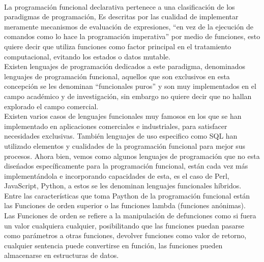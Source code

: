 \begin{multicols}{2}



 \\ %
La programación funcional declarativa pertenece a una clasificación de los paradigmas de programación, 
Es descritas por las cualidad de implementar  meramente mecanismos de evaluación de expresiones,  
``en vez de la ejecución de comandos como lo hace la programación imperativa'' por medio de funciones, 
esto quiere decir que utiliza funciones como factor principal en el tratamiento  computacional, evitando 
los estados o datos mutable.\\
Existen lenguajes de programación dedicados  a este paradigma, denominados lenguajes de programación funcional, 
aquellos que son exclusivos en esta concepción  se les denominan ``funcionales puros'' y son muy implementados en el 
campo académico y de investigación, sin embargo no quiere decir que no hallan explorado el campo comercial.\\
Existen varios casos de lenguajes funcionales muy famosos en los que se han implementado en aplicaciones comerciales e industriales, 
para satisfacer necesidades exclusivas. También lenguajes de uso especifico como SQL han utilizado  elementos y cualidades 
de la programación funcional para mejor sus procesos. 
Ahora bien, vemos como algunos lenguajes de programación que no esta diseńados específicamente para la programación funcional,
están cada vez más implementándola e incorporando capacidades de esta, es el caso de Perl, JavaScript, Python, a estos se les 
denominan lenguajes funcionales híbridos.\\
Entre las características que toma Paython de la programación funcional están las Funciones de orden superior o las funciones 
lambda (funciones anónimas).\\
Las Funciones de orden se refiere a  la manipulación de defunciones como si fuera un valor cualquiera cualquier, posibilitando 
que las funciones puedan pasarse como parámetros a otras funciones, devolver funciones como valor de retorno, cualquier sentencia 
puede convertirse en función, las funciones pueden almacenarse en estructuras de datos.\\


\end{multicols}
